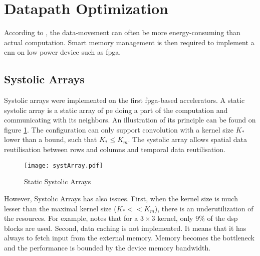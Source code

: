 \section{Datapath Optimization} \label{sec:dtptopti}
According to \cite{chen_eyeriss_2017}, the data-movement can often be more energy-consuming than actual computation. Smart memory management is then required to implement a \acrshort{cnn} on low power device such as \acrshort{fpga}.
%
%
\subsection{Systolic Arrays}
%
%
Systolic arrays were implemented on the first \acrshort{fpga}-based accelerators. A static systolic array is a static array of \acrshort{pe} doing a part of the computation and communicating with its neighbors. An illustration of its principle can be found on figure \ref{fig:sytar}. The configuration can only support convolution with a kernel size $K_*$ lower than a bound, such that $K_* \leq K_m$. The systolic array allows spatial data reutilisation between rows and columns and temporal data reutilisation.\newline \newline
\begin{figure}
    \centering
    \texttt{[image: systArray.pdf]}
    \caption{Static Systolic Arrays}
    \label{fig:sytar}
\end{figure}
However, Systolic Arrays has also issues. First, when the kernel size is much lesser than the maximal kernel size ($K_* << K_m$), there is an underutilization of the resources. For example, \cite{gokhale_240_2014} notes that for a $3 \times 3$ kernel, only $9\%$ of the \acrfull{dsp} blocks are used. Second,  data caching is not implemented. It means that it has always to fetch input from the external memory. Memory becomes the bottleneck and the performance is bounded by the device memory bandwidth.
%
%
